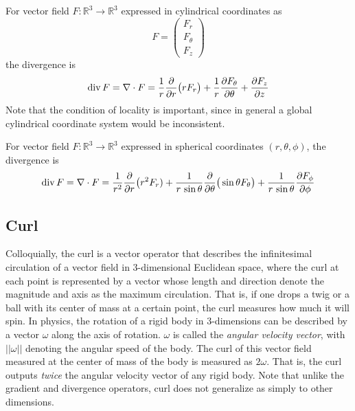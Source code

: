   \begin{lemma}
  For vector field $F: \mathbb{R}^3 \longrightarrow \mathbb{R}^3$ expressed in cylindrical coordinates as 
  \[F = \begin{pmatrix}
  F_r \\ F_\theta \\ F_z
  \end{pmatrix}\]
  the divergence is
  \[\operatorname{div} F = \nabla \cdot F = \frac{1}{r} \frac{\partial}{\partial r} \big(r F_r \big) + \frac{1}{r} \frac{\partial F_\theta}{\partial \theta} + \frac{\partial F_z}{\partial z}\]
  Note that the condition of locality is important, since in general a global cylindrical coordinate system would be inconsistent. 
  \end{lemma}

  \begin{lemma}
  For vector field $F: \mathbb{R}^3 \longrightarrow \mathbb{R}^3$ expressed in spherical coordinates $(r, \theta, \phi)$, the divergence is 
  \[\operatorname{div} F = \nabla \cdot F = \frac{1}{r^2} \frac{\partial}{\partial r} \big( r^2 F_r) + \frac{1}{r \, \sin{\theta}} \frac{\partial}{\partial \theta} \big( \sin{\theta} F_\theta\big) + \frac{1}{r\, \sin{\theta}} \frac{\partial F_\phi}{\partial \phi}\]
  \end{lemma}

\subsection{Curl}

  Colloquially, the curl is a vector operator that describes the infinitesimal circulation of a vector field in $3$-dimensional Euclidean space, where the curl at each point is represented by a vector whose length and direction denote the magnitude and axis as the maximum circulation. That is, if one drops a twig or a ball with its center of mass at a certain point, the curl measures how much it will spin. In physics, the rotation of a rigid body in 3-dimensions can be described by a vector $\omega$ along the axis of rotation. $\omega$ is called the \textit{angular velocity vector}, with $||\omega||$ denoting the angular speed of the body. The curl of this vector field measured at the center of mass of the body is measured as $2 \omega$. That is, the curl outputs \textit{twice} the angular velocity vector of any rigid body. Note that unlike the gradient and divergence operators, curl does not generalize as simply to other dimensions. 

